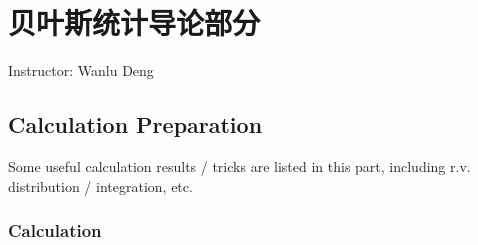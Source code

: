 \chapter{贝叶斯统计导论部分}
\begin{center}
    Instructor: Wanlu Deng
\end{center}
\newcommand{\fixed}[1]{{\color{gray}#1}}

\section{Calculation Preparation}
Some useful calculation results / tricks are listed in this part, including r.v. distribution / integration, etc.

\subsection{Calculation}
